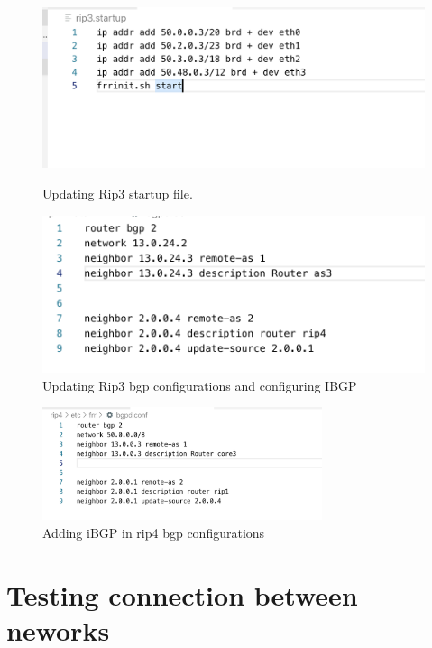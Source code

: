 \begin{figure}[H]
  \centering
  \begin{minipage}[b]{0.45\textwidth}
    \includegraphics[width=\textwidth]{Images/rip3Update.png}
    \caption{Updating Rip3 startup file.}
  \end{minipage}
  \hfill
  \begin{minipage}[b]{0.45\textwidth}
    \includegraphics[width=\textwidth]{Images/rip3As3.png}
    \caption{Updating Rip3 bgp configurations and configuring IBGP}
  \end{minipage}
\end{figure}

\begin{figure}[H]
\centering
  \includegraphics[width=0.73\textwidth]{Images/rip4Upd.png}
  \caption{Adding iBGP in rip4 bgp configurations}
  \label{fig:2.14}
\end{figure}



\section{Testing connection between neworks}
